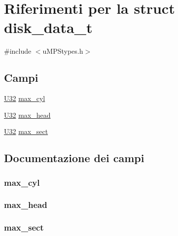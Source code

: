 \hypertarget{structdisk__data__t}{\section{Riferimenti per la struct disk\-\_\-data\-\_\-t}
\label{structdisk__data__t}
}


{\ttfamily \#include $<$u\-M\-P\-Stypes.\-h$>$}

\subsection*{Campi}
\begin{DoxyCompactItemize}
\item 
\hyperlink{lib_2base_8h_ac3df7cf3c8cb172a588adec881447d68}{U32} \hyperlink{structdisk__data__t_aeb8030b3dd1287feefb6380f4c8e3611}{max\-\_\-cyl}
\item 
\hyperlink{lib_2base_8h_ac3df7cf3c8cb172a588adec881447d68}{U32} \hyperlink{structdisk__data__t_aa6c7020fb3ea2240307fe8cef518f4a0}{max\-\_\-head}
\item 
\hyperlink{lib_2base_8h_ac3df7cf3c8cb172a588adec881447d68}{U32} \hyperlink{structdisk__data__t_ab583dd23c9c85bbeacf54b11d8d59a28}{max\-\_\-sect}
\end{DoxyCompactItemize}


\subsection{Documentazione dei campi}
\hypertarget{structdisk__data__t_aeb8030b3dd1287feefb6380f4c8e3611}{
\subsubsection[{max\-\_\-cyl}]{ max\-\_\-cyl}}\label{structdisk__data__t_aeb8030b3dd1287feefb6380f4c8e3611}
\hypertarget{structdisk__data__t_aa6c7020fb3ea2240307fe8cef518f4a0}{
\subsubsection[{max\-\_\-head}]{ max\-\_\-head}}\label{structdisk__data__t_aa6c7020fb3ea2240307fe8cef518f4a0}
\hypertarget{structdisk__data__t_ab583dd23c9c85bbeacf54b11d8d59a28}{
\subsubsection[{max\-\_\-sect}]{ max\-\_\-sect}}\label{structdisk__data__t_ab583dd23c9c85bbeacf54b11d8d59a28}


